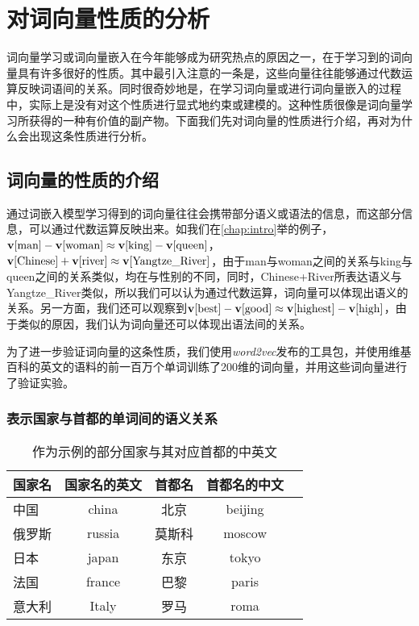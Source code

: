 \iffalse



\fi

\chapter{对词向量性质的分析}

词向量学习或词向量嵌入在今年能够成为研究热点的原因之一，在于学习到的词向量具有许多很好的性质。其中最引入注意的一条是，这些向量往往能够通过代数运算反映词语间的关系。同时很奇妙地是，在学习词向量或进行词向量嵌入的过程中，实际上是没有对这个性质进行显式地约束或建模的。这种性质很像是词向量学习所获得的一种有价值的副产物。下面我们先对词向量的性质进行介绍，再对为什么会出现这条性质进行分析。

\section{词向量的性质的介绍}

通过词嵌入模型学习得到的词向量往往会携带部分语义或语法的信息，而这部分信息，可以通过代数运算反映出来。如我们在\ref{chap:intro}举的例子，${{\mathbf v}}[\mbox{man}]-{{\mathbf v}}[\mbox{woman}] \approx {{\mathbf v}}[\mbox{king}] - {{\mathbf v}}[\mbox{queen}]$，${{\mathbf v}}[\mbox{Chinese}] + {{\mathbf v}}[\mbox{river}] \approx {{\mathbf v}}[\mbox{Yangtze\_River}]$，由于man与woman之间的关系与king与queen之间的关系类似，均在与性别的不同，同时，Chinese+River所表达语义与Yangtze\_River类似，所以我们可以认为通过代数运算，词向量可以体现出语义的关系。另一方面，我们还可以观察到${{\mathbf v}}[\mbox{best}]-{{\mathbf v}}[\mbox{good}] \approx {{\mathbf v}}[\mbox{highest}] - {{\mathbf v}}[\mbox{high}]$，由于类似的原因，我们认为词向量还可以体现出语法间的关系。

为了进一步验证词向量的这条性质，我们使用\emph{word2vec}发布的工具包，并使用维基百科的英文的语料的前一百万个单词训练了200维的词向量，并用这些词向量进行了验证实验。

\subsection{表示国家与首都的单词间的语义关系}

\begin{longtable}{lcccc}
\caption[部分国家与其对应首都的中英文名称]{作为示例的部分国家与其对应首都的中英文} \label{tab:CountyCity} \\
\toprule[1.5pt]
国家名 & 国家名的英文 & 首都名 & 首都名的中文\\
\midrule[1pt]
中国	&	china	&	北京	&	beijing\\
俄罗斯	&	russia	&	莫斯科	&	moscow	\\
日本	&	japan	&	东京	&	tokyo	\\
法国	&	france	&	巴黎	&	paris	\\
意大利	&	Italy	&	罗马	&	roma	\\
\endfirsthead

\end{longtable}

